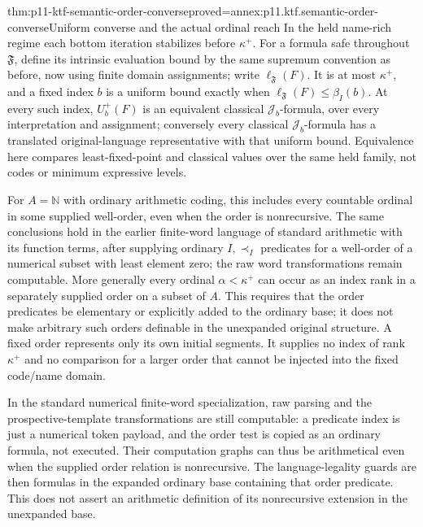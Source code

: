 \begin{hbcorollary}{thm:p11-ktf-semantic-order-converse}{proved=annex:p11.ktf.semantic-order-converse}{Uniform converse and the actual ordinal reach}
In the held name-rich regime each bottom iteration stabilizes before
\(\kappa^+\). For a formula safe throughout \(\mathfrak F\),
define its intrinsic evaluation bound by the same supremum convention
as before, now using finite domain assignments; write
\(\ell_{\mathfrak F}(F)\). It is at most \(\kappa^+\),
and a fixed index \(b\) is a uniform bound exactly when
\(\ell_{\mathfrak F}(F)\leq\beta_I(b)\).
At every such index, \(U_b^+(F)\) is an equivalent classical
\(\mathcal J_b\)-formula, over every interpretation and
assignment; conversely every classical \(\mathcal J_b\)-formula
has a translated original-language representative with that uniform
bound. Equivalence here compares least-fixed-point and classical
values over the same held family, not codes or minimum expressive levels.

For \(A=\mathbb N\) with ordinary arithmetic coding, this
includes every countable ordinal in some supplied well-order, even
when the order is nonrecursive. The same conclusions hold in the
earlier finite-word language of standard arithmetic with its function
terms, after supplying ordinary \(I,\prec_I\) predicates for a
well-order of a numerical subset with least element zero; the raw
word transformations remain computable. More generally every ordinal
\(\alpha<\kappa^+\) can occur as an index rank in a separately
supplied order on a subset of \(A\). This requires that the
order predicates be elementary or explicitly added to the ordinary
base; it does not make arbitrary such orders definable in the
unexpanded original structure. A fixed order represents only its own
initial segments. It supplies no index of rank \(\kappa^+\)
and no comparison for a larger order that cannot be injected into
the fixed code/name domain.
\end{hbcorollary}

In the standard numerical finite-word specialization, raw parsing and
the prospective-template transformations are still computable: a predicate
index is just a numerical token payload, and the order test is copied
as an ordinary formula, not executed. Their computation graphs can thus
be arithmetical even when the supplied order relation is nonrecursive.
The language-legality guards are then formulas in the expanded ordinary
base containing that order predicate. This does not assert an arithmetic
definition of its nonrecursive extension in the unexpanded base.


